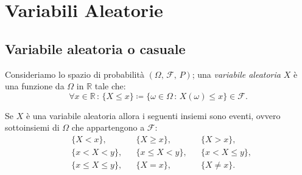 
\chapter{Variabili Aleatorie}
    \section{Variabile aleatoria o casuale}
        \begin{defn}\label{defn:Variabile_aleatoria}
            Consideriamo lo spazio di probabilità $(\Omega,\,\mathscr{F},\,P)$; una \emph{variabile aleatoria} $X$ è una funzione da $\Omega$ in $\mathbb{R}$ tale che: \[
                \forall x \in \mathbb{R} \,:\, \{X \leq x\} \coloneqq \{\omega \in \Omega \,:\, X(\omega) \leq x\} \in \mathscr{F}
            .\]
        \end{defn}
        \begin{prty}\label{prty:Variabile_aleatoria}
            Se $X$ è una variabile aleatoria allora i seguenti insiemi sono eventi, ovvero sottoinsiemi di $\Omega$ che appartengono a $\mathscr{F}$:
            \begin{align*}
                &\{X < x\}, & &\{X \geq x\}, & &\{X > x\}, \\
                &\{x < X < y\}, & &\{x \leq X < y\}, & &\{x < X \leq y\}, \\
                &\{x \leq X \leq y\}, & &\{X = x\}, & &\{X \neq x\}
            .\end{align*}
        \end{prty}
